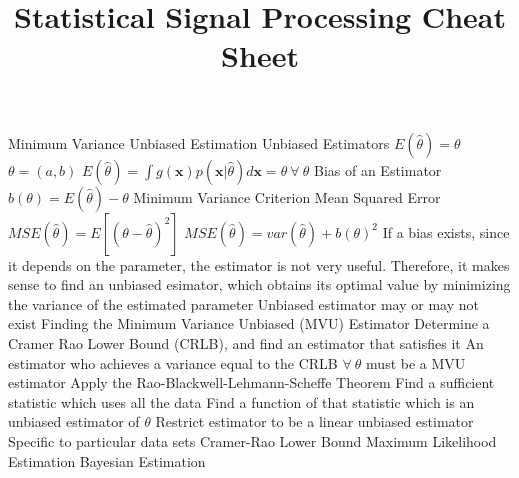 \documentclass[14pt]{extarticle}
\title{Statistical Signal Processing Cheat Sheet}
\begin{document}
	\maketitle
	
	
	\begin{outline}		
		\1	Minimum Variance Unbiased Estimation	%
			\2	Unbiased Estimators
				\3	$E(\hat{\theta}) = \theta$
				\3	$\theta = (a,b)$
				\3	$E(\hat{\theta}) = \int g(\bm{x}) p(\bm{x} | \hat{\theta}) d\bm{x} = \theta~\forall~\theta$
			\2	Bias of an Estimator
				\3	$b(\theta) = E(\hat{\theta}) - \theta$
			\2	Minimum Variance Criterion
				\3	Mean Squared Error
					\4	$MSE(\hat{\theta}) = E[(\theta - \hat{\theta})^2]$
					\4	$MSE(\hat{\theta}) = var(\hat{\theta}) + b(\theta)^2$
				\3	If a bias exists, since it depends on the parameter, the estimator
						is not very useful.  Therefore, it makes sense to find an unbiased
						esimator, which obtains its optimal value by minimizing the variance
						of the estimated parameter
				\3	Unbiased estimator may or may not exist
			\2	Finding the Minimum Variance Unbiased (MVU) Estimator
				\3	Determine a Cramer Rao Lower Bound (CRLB), and find an estimator that satisfies it
					\4	An estimator who achieves a variance equal to the CRLB $\forall~\theta$ must be a MVU estimator
				\3	Apply the Rao-Blackwell-Lehmann-Scheffe Theorem
					\4	Find a sufficient statistic which uses all the data
					\4	Find a function of that statistic which is an unbiased estimator of $\theta$
				\3	Restrict estimator to be a linear unbiased estimator
					\4	Specific to particular data sets
		\1	Cramer-Rao Lower Bound	%
		\1	Maximum Likelihood Estimation	%
		\1	Bayesian Estimation %
	\end{outline}
\end{document}
